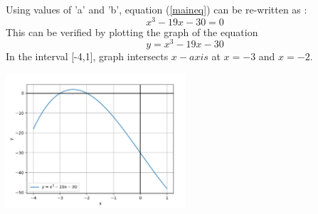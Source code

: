 \documentclass[journal,12pt,twocolumn]{IEEEtran}
\begin{document}
\begin{itemize}
    Using values of 'a' and 'b', equation (\ref{maineq}) can be re-written as :
    \begin{equation}
    \label{Peq}
        x^3-19x-30=0
    \end{equation}
    This can be verified by plotting the graph of the equation
    $$y=x^3-19x-30$$
    In the interval [-4,1], graph intersects $x-axis$ at $x=-3$ and $x=-2$.

\includegraphics[width=0.5\textwidth]{Graph.png}
\label{graph}
   \end{itemize}
\end{document}
